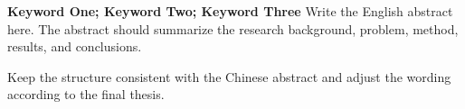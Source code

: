 \begin{abstract}{\textbf{关键词一；关键词二；关键词三}}
这里填写中文摘要。摘要应概括论文的研究背景、主要问题、方法、实验结果和结论。

可以根据学校格式要求控制摘要篇幅，通常包括研究目的、研究内容、创新点和应用价值（一般来讲，中文摘要less than一页，英文随便）。
\end{abstract}

\begin{abstractEn}{\textbf{Keyword One; Keyword Two; Keyword Three}}
Write the English abstract here. The abstract should summarize the research background, problem, method, results, and conclusions.

Keep the structure consistent with the Chinese abstract and adjust the wording according to the final thesis.
\end{abstractEn}
